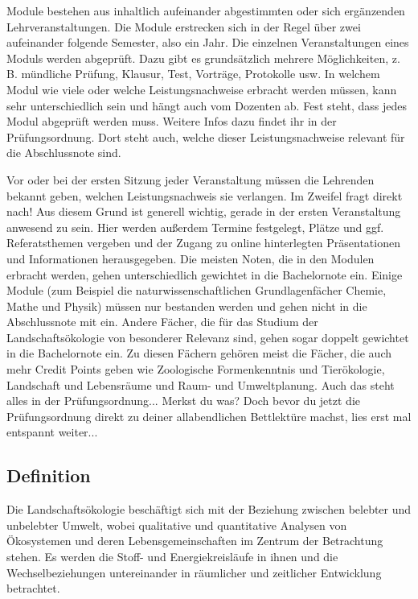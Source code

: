 Module bestehen aus inhaltlich aufeinander abgestimmten oder sich ergänzenden Lehrveranstaltungen. Die Module erstrecken sich in der Regel über zwei aufeinander folgende Semester, also ein Jahr. Die einzelnen Veranstaltungen eines Moduls werden abgeprüft. Dazu gibt es grundsätzlich mehrere Möglichkeiten, z. B. mündliche Prüfung, Klausur, Test, Vorträge, Protokolle usw. In welchem Modul wie viele oder welche Leistungsnachweise erbracht werden müssen, kann sehr unterschiedlich sein und hängt auch vom Dozenten ab. Fest steht, dass jedes Modul abgeprüft werden muss. Weitere Infos dazu findet ihr in der Prüfungsordnung. Dort steht auch, welche dieser Leistungsnachweise relevant für die Abschlussnote sind.

Vor oder bei der ersten Sitzung jeder Veranstaltung müssen die Lehrenden bekannt geben, welchen Leistungsnachweis sie verlangen. Im Zweifel fragt direkt nach! Aus diesem Grund ist generell wichtig, gerade in der ersten Veranstaltung anwesend zu sein. Hier werden außerdem Termine festgelegt, Plätze und ggf. Referatsthemen vergeben und der Zugang zu online hinterlegten Präsentationen und Informationen herausgegeben.
Die meisten Noten, die in den Modulen erbracht werden, gehen unterschiedlich gewichtet in die Bachelornote ein. Einige Module (zum Beispiel die naturwissenschaftlichen Grundlagenfächer Chemie, Mathe und Physik) müssen nur bestanden werden und gehen nicht in die Abschlussnote mit ein. Andere Fächer, die für das Studium der Landschaftsökologie von besonderer Relevanz sind, gehen sogar doppelt gewichtet in die Bachelornote ein. Zu diesen Fächern gehören meist die Fächer, die auch mehr Credit Points geben wie Zoologische Formenkenntnis und Tierökologie, Landschaft und Lebensräume und Raum- und Umweltplanung. Auch das steht alles in der Prüfungsordnung... Merkst du was? Doch bevor du jetzt die Prüfungsordnung direkt zu deiner allabendlichen Bettlektüre machst, lies erst mal entspannt weiter...

\subsection*{Definition}
Die Landschaftsökologie beschäftigt sich mit der Beziehung zwischen belebter und unbelebter Umwelt, wobei qualitative und quantitative Analysen von Ökosystemen und deren Lebensgemeinschaften im Zentrum der Betrachtung stehen. Es werden die Stoff- und Energiekreisläufe in ihnen und die Wechselbeziehungen untereinander in räumlicher und zeitlicher Entwicklung betrachtet.

